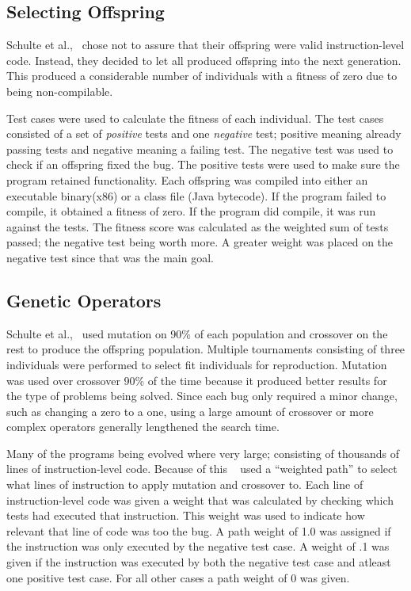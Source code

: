\documentclass{sig-alternate}
\begin{document}
\subsection{Selecting Offspring } 
Schulte et al.,~\cite{Assembly:2010} chose not to assure that their offspring were valid instruction-level code. Instead, they decided to let all produced offspring into the next generation. This produced a considerable number of individuals with a fitness of zero due to being non-compilable.

Test cases were used to calculate the fitness of each individual. The test cases consisted of a set of \textit{positive} tests and one \textit{negative} test; positive meaning already passing tests and negative meaning a failing test. The negative test was used to check if an offspring fixed the bug. The positive tests were used to make sure the program retained functionality. Each offspring was compiled into either an executable binary(x86) or a class file (Java bytecode). If the program failed to compile, it obtained a fitness of zero. If the program did compile, it was run against the tests. The fitness score was calculated as the weighted sum of tests passed; the negative test being worth more. A greater weight was placed on the negative test since that was the main goal.

\subsection{Genetic Operators}
Schulte et al.,~\cite{Assembly:2010} used mutation on 90\% of each population and crossover on the rest to produce the offspring population. Multiple tournaments consisting of three individuals were performed to select fit individuals for reproduction. Mutation was used over crossover 90\% of the time because it produced better results for the type of problems being solved. Since each bug only required a minor change, such as changing a zero to a one, using a large amount of crossover or more complex operators generally lengthened the search time.

Many of the programs being evolved where very large; consisting of thousands of lines of instruction-level code. Because of this ~\cite{Assembly:2010} used a ``weighted path'' to select what lines of instruction to apply mutation and crossover to. Each line of instruction-level code was given a weight that was calculated by checking which tests had executed that instruction. This weight was used to indicate how relevant that line of code was too the bug. A path weight of 1.0 was assigned if the instruction was only executed by the negative test case. A weight of .1 was given if the instruction was executed by both the negative test case and atleast one positive test case. For all other cases a path weight of 0 was given.
\end{document}
